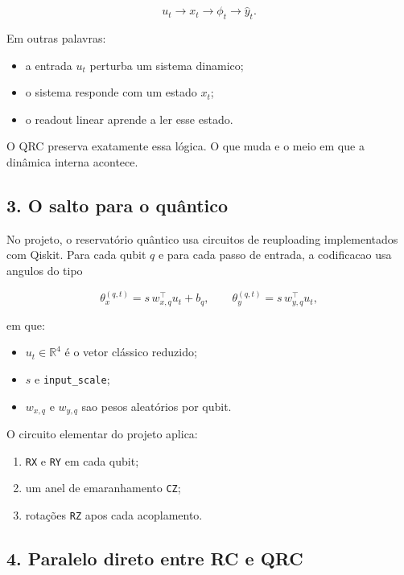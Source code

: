 \documentclass[12pt]{article}
\providecommand{\tightlist}{%
  \setlength{\itemsep}{0pt}\setlength{\parskip}{0pt}}
\begin{document}
\[
u_t \longrightarrow x_t \longrightarrow \phi_t \longrightarrow \hat{y}_t.
\]

Em outras palavras:

\begin{itemize}
\tightlist
\item
  a entrada \(u_t\) perturba um sistema dinamico;
\item
  o sistema responde com um estado \(x_t\);
\item
  o readout linear aprende a ler esse estado.
\end{itemize}

O QRC preserva exatamente essa lógica. O que muda e o meio em que a dinâmica interna acontece.

\subsection{3. O salto para o quântico}\label{3-o-salto-para-o-quuxe2ntico}

No projeto, o reservatório quântico usa circuitos de reuploading implementados com Qiskit. Para cada qubit \(q\) e para cada passo de entrada, a codificacao usa angulos do tipo

\[
\theta^{(q,t)}_x = s \, w_{x,q}^\top u_t + b_q,
\qquad
\theta^{(q,t)}_y = s \, w_{y,q}^\top u_t,
\]

em que:

\begin{itemize}
\tightlist
\item
  \(u_t \in \mathbb{R}^4\) é o vetor clássico reduzido;
\item
  \(s\) e \texttt{input\_scale};
\item
  \(w_{x,q}\) e \(w_{y,q}\) sao pesos aleatórios por qubit.
\end{itemize}

O circuito elementar do projeto aplica:

\begin{enumerate}
\def\labelenumi{\arabic{enumi}.}
\tightlist
\item
  \texttt{RX} e \texttt{RY} em cada qubit;
\item
  um anel de emaranhamento \texttt{CZ};
\item
  rotações \texttt{RZ} apos cada acoplamento.
\end{enumerate}

\subsection{4. Paralelo direto entre RC e QRC}\label{4-paralelo-direto-entre-rc-e-qrc}
\end{document}

